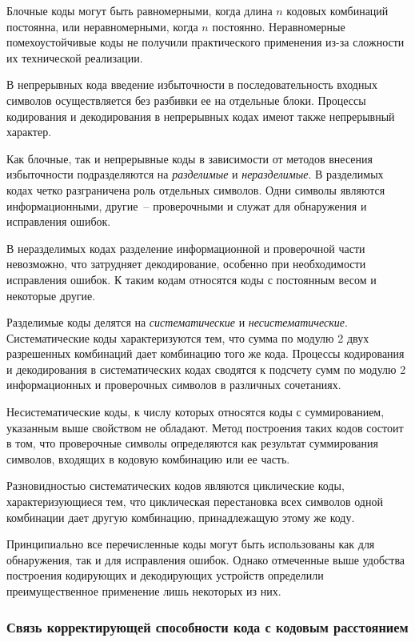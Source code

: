 \documentclass[12pt,a4paper]{article}
\begin{document}
  Блочные коды могут быть равномерными, когда длина $n$ кодовых комбинаций постоянна, или неравномерными, когда $n$ постоянно. Неравномерные помехоустойчивые коды не получили практического применения из-за сложности их технической реализации.
  
  В непрерывных кода введение избыточности в последовательность входных символов осуществляется без разбивки ее на отдельные блоки. Процессы кодирования и декодирования в непрерывных кодах имеют также непрерывный характер.
  
  Как блочные, так и непрерывные коды в зависимости от методов внесения избыточности подразделяются на \emph{разделимые} и \emph{неразделимые}. В разделимых кодах четко разграничена роль отдельных символов. Одни символы являются информационными, другие~-- проверочными и служат для обнаружения и исправления ошибок.
  
  В неразделимых кодах раз­деление информационной и проверочной части невозможно, что затрудняет декодирование, особенно при необходимости исправления ошибок. К таким кодам относятся коды с постоянным весом и некото­рые другие.
  
  Разделимые коды делятся на \emph{систематические} и \emph{несистематические}. Систематические коды характеризуются тем, что сумма по модулю 2 двух разрешенных комбинаций дает комбинацию того же кода. Процессы кодирования и декодирования в систематических кодах  сводятся к подсчету сумм по модулю 2 информационных и проверочных символов в различных сочетаниях.

  Несистематические коды, к числу которых относятся коды с суммированием, указанным выше свойством не обладают. Метод построения таких кодов состоит в том, что проверочные символы определяются как результат суммирования символов, входящих в кодовую комбинацию или ее часть.

  Разновидностью систематических кодов являются циклические коды, характеризующиеся тем, что циклическая перестановка всех символов одной комбинации дает другую комбинацию, принадлежащую этому же коду.

  Принципиально все перечисленные коды могут быть использованы как для обнаружения, так и для  исправления ошибок. Однако отмеченные выше удобства построения кодирующих и декодирующих устройств  определили преимущественное  применение  лишь  некоторых из них.
  
\subsubsection{Связь корректирующей способности кода с кодовым расстоянием}
  
\end{document}
